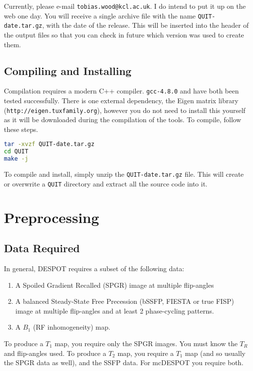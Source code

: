 \documentclass{report}
\begin{document}
Currently, please e-mail \texttt{tobias.wood@kcl.ac.uk}. I do intend to put it up on the web one day. You will receive a single archive file with the name \texttt{QUIT-date.tar.gz}, with the date of the release. This will be inserted into the header of the output files so that you can check in future which version was used to create them.

\section{Compiling and Installing}

Compilation requires a modern C++ compiler. \texttt{gcc-4.8.0} and  have both been tested successfully. There is one external dependency, the Eigen matrix library (\texttt{http://eigen.tuxfamily.org}), however you do not need to install this yourself as it will be downloaded during the compilation of the tools. To compile, follow these steps.
\begin{lstlisting}[language=sh]
tar -xvzf QUIT-date.tar.gz
cd QUIT
make -j
\end{lstlisting}
To compile and install, simply unzip the \texttt{QUIT-date.tar.gz} file. This will create or overwrite a \texttt{QUIT} directory and extract all the source code into it.

\chapter{Preprocessing}

\section{Data Required}

In general, DESPOT requires a subset of the following data:
\begin{enumerate} \itemsep1pt \parskip0pt 
  \item A Spoiled Gradient Recalled (SPGR) image at multiple flip-angles
  \item A balanced Steady-State Free Precession (bSSFP, FIESTA or true FISP) image at multiple flip-angles and at least 2 phase-cycling patterns.
  \item A $B_1$ (RF inhomogeneity) map.
\end{enumerate}

To produce a $T_1$ map, you require only the SPGR images. You must know the $T_R$ and flip-angles used. To produce a $T_2$ map, you require a $T_1$ map (and so usually the SPGR data as well), and the SSFP data. For mcDESPOT you require both.
\end{document}
